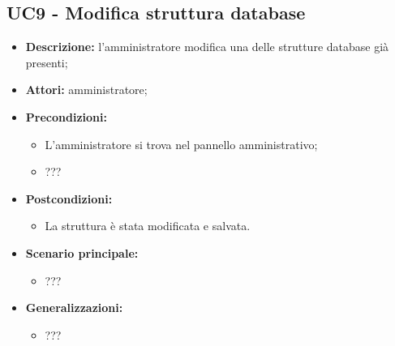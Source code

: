 \documentclass[5pt]{article}
\begin{document}
\subsection{UC9 - Modifica struttura database}
\label{sec:UC9}
\begin{itemize}
    \item \textbf{Descrizione:}  l’amministratore modifica una delle strutture database già presenti;
    \item \textbf{Attori:} amministratore;
    \item \textbf{Precondizioni:} 
    \begin{itemize}
        \item L’amministratore si trova nel pannello amministrativo;
        \item ???
    \end{itemize}
    \item \textbf{Postcondizioni:} 
    \begin{itemize}
        \item La struttura è stata modificata e salvata.
    \end{itemize}
    \item \textbf{Scenario principale:} 
    \begin{itemize}
        \item ???
    \end{itemize}
    \item \textbf{Generalizzazioni:} 
    \begin{itemize}
        \item ???
    \end{itemize}
\end{itemize}
\end{document}

